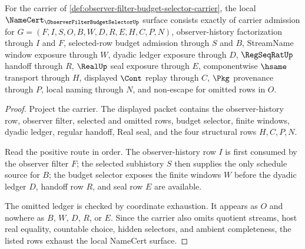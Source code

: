 \begin{theorem}
\label{thm:observer-filter-budget-selector-namecert-surface}
For the carrier of \autoref{def:observer-filter-budget-selector-carrier}, the local $\NameCert_{\ObserverFilterBudgetSelectorUp}$ surface consists exactly of carrier admission for $G=(F,I,S,O,B,W,D,R,E,H,C,P,N)$, observer-history factorization through $I$ and $F$, selected-row budget admission through $S$ and $B$, StreamName window exposure through $W$, dyadic ledger exposure through $D$, $\RegSeqRatUp$ handoff through $R$, $\RealUp$ seal exposure through $E$, componentwise $\hsame$ transport through $H$, displayed $\Cont$ replay through $C$, $\Pkg$ provenance through $P$, local naming through $N$, and non-escape for omitted rows in $O$.
\end{theorem}
\begin{proof}
Project the carrier. The displayed packet contains the observer-history row, observer filter, selected and omitted rows, budget selector, finite windows, dyadic ledger, regular handoff, Real seal, and the four structural rows $H,C,P,N$.

Read the positive route in order. The observer-history row $I$ is first consumed by the observer filter $F$; the selected subhistory $S$ then supplies the only schedule source for $B$; the budget selector exposes the finite windows $W$ before the dyadic ledger $D$, handoff row $R$, and seal row $E$ are available.

The omitted ledger is checked by coordinate exhaustion. It appears as $O$ and nowhere as $B$, $W$, $D$, $R$, or $E$. Since the carrier also omits quotient streams, host real equality, countable choice, hidden selectors, and ambient completeness, the listed rows exhaust the local NameCert surface.
\end{proof}

